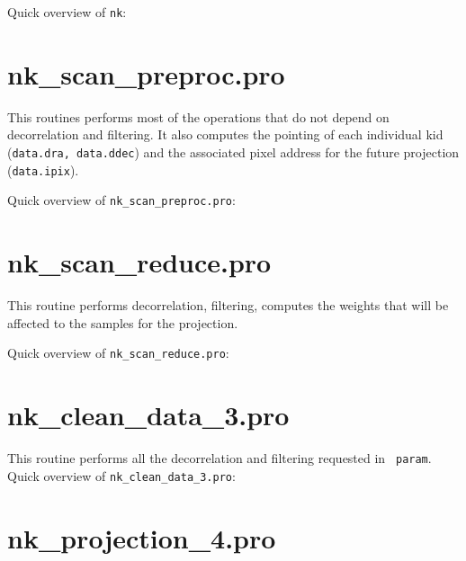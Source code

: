 \documentclass[a4paper,10pt]{article}
\begin{document}
Quick overview of {\tt nk}:


\section{nk\_scan\_preproc.pro}

This routines performs most of the operations that do not depend on
decorrelation and filtering. It also computes the pointing of each individual
kid ({\tt data.dra, data.ddec}) and the associated pixel address for the future
projection ({\tt data.ipix}).

Quick overview of {\tt nk\_scan\_preproc.pro}:



\section{nk\_scan\_reduce.pro}

This routine performs decorrelation, filtering, computes the weights that will
be affected to the samples for the projection.

Quick overview of {\tt nk\_scan\_reduce.pro}:


\section{nk\_clean\_data\_3.pro}
This routine performs all the decorrelation and filtering requested in {\tt
  param}.
Quick overview of {\tt nk\_clean\_data\_3.pro}:
%

\section{nk\_projection\_4.pro}
%








\begin{thebibliography}{}
\end{thebibliography}
\end{document}
